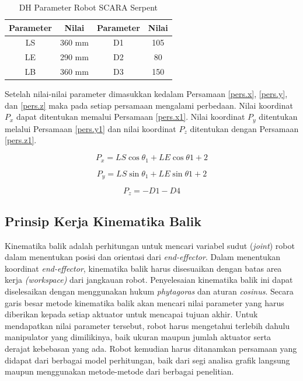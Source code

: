 \begin{table}[H]
	\centering
	\caption{DH Parameter Robot SCARA Serpent}
	\label{tbl.konstanSCARA Serpent}
	\begin{tabular}{|c|c|c|c|}
		\hline
		\rowcolor[HTML]{9B9B9B} 
		Parameter & Nilai & Parameter & Nilai  \\ \hline
		LS    & 360 mm & D1      & 105          \\ \hline
		LE    & 290 mm &D2    & 80       \\ \hline
		LB    & 360 mm     & D3      &150    \\ \hline
		
	\end{tabular}
	
\end{table}

Setelah nilai-nilai parameter dimasukkan kedalam Persamaan \ref{pers.x}, \ref{pers.y}, dan \ref{pers.z} maka pada setiap persamaan mengalami perbedaan. Nilai koordinat $P_{x}$ dapat ditentukan memalui Persamaan \ref{pers.x1}. Nilai koordinat $P_{y}$ ditentukan melalui Persamaan \ref{pers.y1} dan nilai koordinat $P_{z}$ ditentukan dengan Persamaan \ref{pers.z1}.

\begin{equation}
P_{x}=LS\cos\theta_{1}+LE\cos\theta{1+2}
\label{pers.x1}
\end{equation}

\begin{equation}
P_{y}=LS\sin\theta_{1}+LE\sin\theta{1+2}
\label{pers.y1}
\end{equation}

\begin{equation}
P_{z}=-D1-D4
\label{pers.z1}
\end{equation}

\subsection{Prinsip Kerja Kinematika Balik}
Kinematika balik adalah perhitungan untuk mencari variabel sudut (\textit{joint}) robot dalam menentukan posisi dan orientasi dari \textit{end-effector}. Dalam menentukan koordinat \textit{end-effector}, kinematika balik harus disesuaikan dengan batas area kerja \textit{(workspace)} dari jangkauan robot. Penyelesaian kinematika balik ini dapat diselesaikan dengan menggunakan hukum \textit{phytagoras} dan aturan \textit{cosinus}. 
Secara garis besar metode kinematika balik akan mencari nilai parameter yang harus diberikan kepada setiap aktuator untuk mencapai tujuan akhir. Untuk mendapatkan nilai parameter tersebut, robot harus mengetahui terlebih dahulu manipulator yang dimilikinya, baik ukuran maupun jumlah aktuator serta derajat kebebasan yang ada. Robot kemudian harus ditanamkan persamaan yang didapat dari berbagai model perhitungan, baik dari segi analisa grafik langsung maupun menggunakan metode-metode dari berbagai penelitian. 

